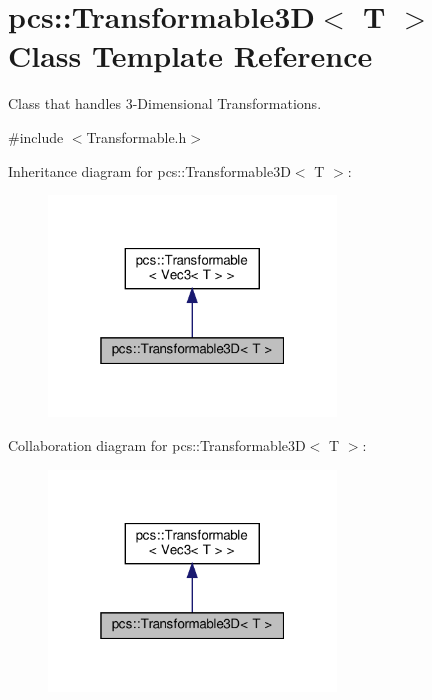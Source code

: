 \hypertarget{classpcs_1_1Transformable3D}{}\section{pcs\+:\+:Transformable3D$<$ T $>$ Class Template Reference}
\label{classpcs_1_1Transformable3D}


Class that handles 3-\/\+Dimensional Transformations.  




{\ttfamily \#include $<$Transformable.\+h$>$}



Inheritance diagram for pcs\+:\+:Transformable3D$<$ T $>$\+:\nopagebreak
\begin{figure}[H]
\begin{center}
\leavevmode
\includegraphics[width=217pt]{classpcs_1_1Transformable3D__inherit__graph}
\end{center}
\end{figure}


Collaboration diagram for pcs\+:\+:Transformable3D$<$ T $>$\+:\nopagebreak
\begin{figure}[H]
\begin{center}
\leavevmode
\includegraphics[width=217pt]{classpcs_1_1Transformable3D__coll__graph}
\end{center}
\end{figure}
